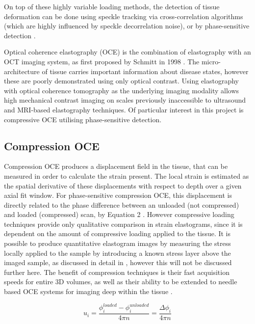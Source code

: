 On top of these highly variable loading methods, the detection of tissue deformation can be done using speckle tracking via cross-correlation algorithms (which are highly influenced by speckle decorrelation noise), or by phase-sensitive detection \cite{kennedy_strain_2012}.

Optical coherence elastography (OCE) is the combination of elastography with an OCT imaging system, as first proposed by Schmitt in 1998 \cite{schmitt_oct_1998}. The micro-architecture of tissue carries important information about disease states, however these are poorly demonstrated using only optical contrast. Using elastography with optical coherence tomography as the underlying imaging modality allows high mechanical contrast imaging on scales previously inaccessible to ultrasound and MRI-based elastography techniques. Of particular interest in this project is compressive OCE utilising phase-sensitive detection. 

\subsection{Compression OCE}
Compression OCE produces a displacement field in the tissue, that can be measured in order to calculate the strain present. The local strain is estimated as the spatial derivative of these displacements with respect to depth \cite{kennedy_review_2014} over a given axial fit window. For phase-sensitive compression OCE, this displacement is directly related to the phase difference between an unloaded (not compressed) and loaded (compressed) scan, by Equation 2 \cite{kennedy_strain_2012}. However compressive loading techniques provide only qualitative comparison in strain elastograms, since it is dependent on the amount of compressive loading applied to the tissue. It is possible to produce quantitative elastogram images by measuring the stress locally applied to the sample by introducing a known stress layer above the imaged sample, as discussed in detail in \cite{kennedy_quantitative_2015}, however this will not be discussed further here. The benefit of compression techniques is their fast acquisition speeds for entire 3D volumes, as well as their ability to be extended to needle based OCE systems for imaging deep within the tissue \cite{kennedy_review_2014}. 

\begin{equation}
u_i = \frac{\phi_i^{loaded}-\phi_i^{unloaded}}{4\pi n} = \frac{\Delta\phi_i}{4\pi n}
\end{equation}

